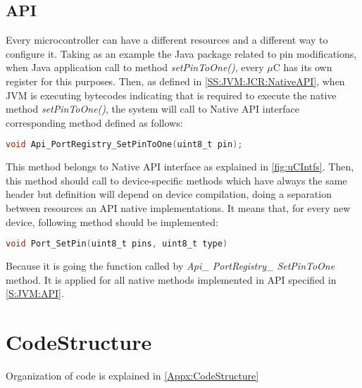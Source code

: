 \subsection{API}\label{SS:JVM:Micros:API}
Every microcontroller can have a different resources and a different way to configure it. Taking as an example the Java package related to pin modifications, when Java application call to method \textit{setPinToOne()}, every $\mu$C has its own register for this purposes. Then, as defined in \ref{SS:JVM:JCR:NativeAPI}, when JVM is executing bytecodes indicating that is required to execute the native method \textit{setPinToOne()}, the system will call to Native API interface corresponding method defined as follows:

\medskip
\begin{lstlisting}[language=C]
void Api_PortRegistry_SetPinToOne(uint8_t pin);
\end{lstlisting}
\medskip

This method belongs to Native API interface as explained in \ref{fig:uCIntfs}. Then, this method should call to device-specific methods which have always the same header but definition will depend on device compilation, doing a separation between resources an API native implementations. It means that, for every new device, following method should be implemented:

\medskip
\begin{lstlisting}[language=C]
void Port_SetPin(uint8_t pins, uint8_t type)
\end{lstlisting}
\medskip

Because it is going the function called by \textit{Api\_ PortRegistry\_ SetPinToOne} method. It is applied for all native methods implemented in API specified in \ref{S:JVM:API}.

\section{CodeStructure}\label{S:JVM:Code}
Organization of code is explained in \ref{Appx:CodeStructure}

